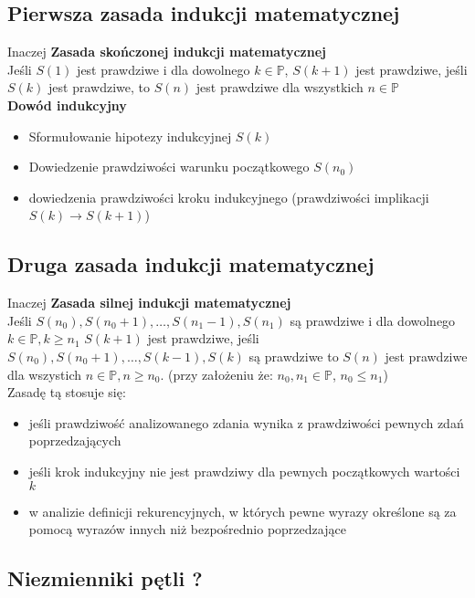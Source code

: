 \documentclass[a4paper,12pt]{article}
\begin{document}
\subsection{Pierwsza zasada indukcji matematycznej}
Inaczej \textbf{Zasada skończonej indukcji matematycznej} \\
Jeśli $S(1)$ jest prawdziwe i dla dowolnego $k \in \mathbb{P}$, $S(k+1)$ jest prawdziwe, jeśli $S(k)$ jest prawdziwe, to $S(n)$ jest prawdziwe dla wszystkich $n \in \mathbb{P}$ \\ %

\textbf{Dowód indukcyjny}
\begin{itemize} \itemsep1pt \parskip0pt 
 \item Sformułowanie hipotezy indukcyjnej $S(k)$
 \item Dowiedzenie prawdziwości warunku początkowego $S(n_0)$
 \item dowiedzenia prawdziwości kroku indukcyjnego (prawdziwości implikacji $S(k)\rightarrow S(k+1)$)
\end{itemize}
\subsection{Druga zasada indukcji matematycznej}
Inaczej \textbf{Zasada silnej indukcji matematycznej} \\
Jeśli $S(n_0), S(n_0+1), \dots ,S(n_1-1), S(n_1)$ są prawdziwe i dla dowolnego $k\in\mathbb{P}, k\geq n_1$ $S(k+1)$ jest prawdziwe, jeśli $S(n_0), S(n_0+1), \dots ,S(k-1), S(k)$ są prawdziwe to $S(n)$ jest prawdziwe dla wszystich $n \in\mathbb{P}, n\geq n_0$. (przy założeniu że: $n_0, n_1 \in\mathbb{P}$, $n_0\leq n_1$) \\
Zasadę tą stosuje się:
\begin{itemize}\itemsep1pt \parskip0pt 
 \item jeśli prawdziwość analizowanego zdania wynika z prawdziwości pewnych zdań poprzedzających
 \item jeśli krok indukcyjny nie jest prawdziwy dla pewnych początkowych wartości $k$
 \item w analizie definicji rekurencyjnych, w których pewne wyrazy określone są za pomocą wyrazów innych niż bezpośrednio poprzedzające
\end{itemize}
\subsection{Niezmienniki pętli ?}
\end{document}
